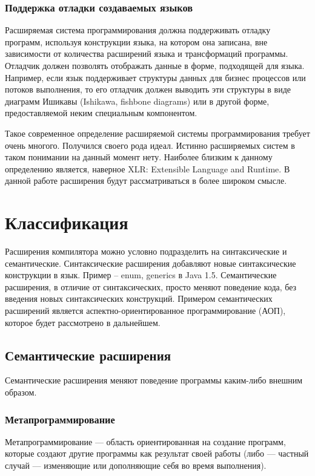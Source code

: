 \documentclass[a4paper,12pt]{article}
\begin{document}
\subsubsection{Поддержка отладки создаваемых языков}
Расширяемая система программирования должна поддерживать отладку программ,
используя конструкции языка, на котором она записана, вне зависимости от
количества расширений языка и трансформаций программы. Отладчик должен
позволять отображать данные в форме, подходящей для языка. Например, если язык
поддерживает структуры данных для бизнес процессов или потоков выполнения, то
его отладчик должен выводить эти структуры в виде диаграмм Ишикавы
(Ishikawa, fishbone diagrams) или в другой форме, предоставляемой неким
специальным компонентом.

Такое современное определение расширяемой системы программирования требует
очень многого. Получился своего рода идеал. Истинно расширяемых систем в таком
понимании на данный момент нету. Наиболее близким к данному определению
является, наверное XLR: Extensible Language and Runtime. В данной работе
расширения будут рассматриваться в более широком смысле.

\section{Классификация}

Расширения компилятора можно условно подразделить на синтаксические и
семантические. Синтаксические расширения добавляют новые синтаксические
конструкции в язык. Пример – enum, generics в Java 1.5. Семантические
расширения, в отличие от синтаксических, просто меняют поведение кода, без
введения новых синтаксических конструкций. Примером семантических расширений
является аспектно-ориентированное программирование (АОП), которое будет
рассмотрено в дальнейшем.

\subsection{Семантические расширения}

Семантические расширения меняют поведение программы каким-либо внешним образом.

\subsubsection{Метапрограммирование}
Метапрограммирование — область ориентированная на создание программ, которые
создают другие программы как результат своей работы (либо — частный случай —
изменяющие или дополняющие себя во время выполнения).
\end{document}
